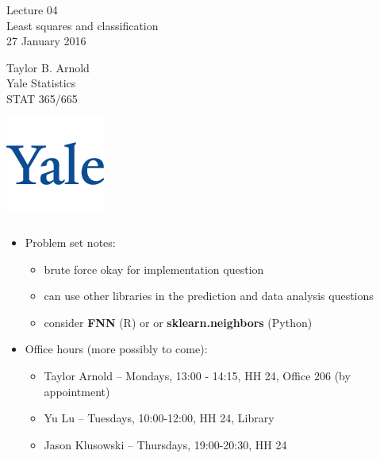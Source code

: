 \documentclass[xetex,mathserif,serif,aspectratio=169]{beamer}
\begin{document}
\begin{frame}[fragile] \frametitle{} \oldB \small

\vfill

{\fontsize{0.7cm}{0cm}\selectfont Lecture 04 \\\vspace{0.2cm} Least squares and classification}\\\vspace{0.5cm}
27 January 2016

\vspace{2cm}

\begin{minipage}{0.6\textwidth}
Taylor B. Arnold \\
Yale Statistics \\
STAT 365/665
\end{minipage}
\hfill
\begin{minipage}{0.3\textwidth}\raggedleft
\includegraphics[scale=0.3]{../yale-logo.png}
\end{minipage}%

\end{frame}

\begin{frame}[fragile] \frametitle{} \oldB \small

\begin{itemize}
\item Problem set notes:
\begin{itemize}
\item brute force okay for implementation question
\item can use other libraries in the prediction and data analysis questions
\item consider \textbf{FNN} (R) or or \textbf{sklearn.neighbors} (Python)
\end{itemize}
\item Office hours (more possibly to come):
\begin{itemize}
\item Taylor Arnold -- Mondays, 13:00 - 14:15, HH 24, Office 206 (by appointment)
\item Yu Lu -- Tuesdays, 10:00-12:00, HH 24, Library
\item Jason Klusowski -- Thursdays, 19:00-20:30, HH 24
\end{itemize}
\end{itemize}

\end{frame}
\end{document}
